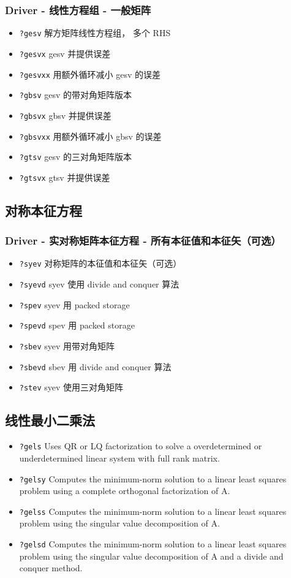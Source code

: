 \subsubsection{Driver - 线性方程组 - 一般矩阵}
\begin{itemize}
\item \verb|?gesv| 解方矩阵线性方程组， 多个 RHS
\item \verb|?gesvx| gesv 并提供误差
\item \verb|?gesvxx| 用额外循环减小 gesv 的误差
\item \verb|?gbsv| gesv 的带对角矩阵版本
\item \verb|?gbsvx| gbsv 并提供误差
\item \verb|?gbsvxx| 用额外循环减小 gbsv 的误差
\item \verb|?gtsv| gesv 的三对角矩阵版本
\item \verb|?gtsvx| gtsv 并提供误差
\end{itemize}


\subsection{对称本征方程}
\subsubsection{Driver - 实对称矩阵本征方程 - 所有本征值和本征矢（可选）}
\begin{itemize}
\item \verb|?syev| 对称矩阵的本征值和本征矢（可选）
\item \verb|?syevd| syev 使用 divide and conquer 算法
\item \verb|?spev| syev 用 packed storage
\item \verb|?spevd| spev 用 packed storage
\item \verb|?sbev| syev 用带对角矩阵
\item \verb|?sbevd| sbev 用 divide and conquer 算法
\item \verb|?stev| syev 使用三对角矩阵
\end{itemize}

\subsection{线性最小二乘法}
\begin{itemize}
\item \verb|?gels| Uses QR or LQ factorization to solve a overdetermined or underdetermined linear system with full rank matrix.
\item \verb|?gelsy| Computes the minimum-norm solution to a linear least squares problem using a complete orthogonal factorization of A.
\item \verb|?gelss| Computes the minimum-norm solution to a linear least squares problem using the singular value decomposition of A.
\item \verb|?gelsd| Computes the minimum-norm solution to a linear least squares problem using the singular value decomposition of A and a divide and conquer method.
\end{itemize}

